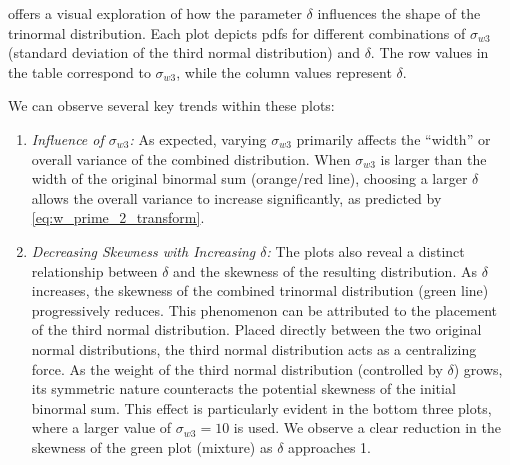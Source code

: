  offers a visual exploration of how the parameter $\delta$ influences
the shape of the trinormal distribution.
Each plot depicts \glspl{pdf} for different combinations of $\sigma_{w3}$
(standard deviation of the third normal distribution) and $\delta$.
The row values in the table correspond to $\sigma_{w3}$,
while the column values represent $\delta$.

We can observe several key trends within these plots:

\begin{enumerate}
    \item \emph{Influence of $\sigma_{w3}$:}
    As expected, varying $\sigma_{w3}$ primarily affects the \enquote{width}
    or overall variance of the combined distribution.
    When $\sigma_{w3}$ is larger than the width of the original binormal sum (orange/red line),
    choosing a larger $\delta$ allows the overall variance to increase significantly,
    as predicted by \cref{eq:w_prime_2_transform}.

    \item \emph{Decreasing Skewness with Increasing $\delta$:}
    The plots also reveal a distinct relationship between $\delta$
    and the skewness of the resulting distribution.
    As $\delta$ increases,
    the skewness of the combined trinormal distribution (green line) progressively reduces.
    This phenomenon can be attributed to the placement of the third normal distribution.
    Placed directly between the two original normal distributions,
    the third normal distribution acts as a centralizing force.
    As the weight of the third normal distribution (controlled by $\delta$) grows,
    its symmetric nature counteracts the potential skewness of the initial binormal sum.
    This effect is particularly evident in the bottom three plots,
    where a larger value of $\sigma_{w3} = 10$ is used.
    We observe a clear reduction in the skewness of the green plot (mixture) as $\delta$ approaches 1.
\end{enumerate}
